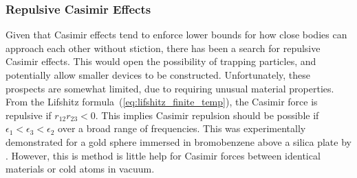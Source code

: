 




\subsubsection{Repulsive Casimir Effects}

Given that Casimir effects tend to enforce lower bounds for how close bodies can approach each other
without stiction, there has been a search for repulsive Casimir effects.  This would open the possibility
of trapping particles, and potentially allow smaller devices to be constructed.  
Unfortunately, these prospects are somewhat limited, due to requiring unusual material properties.
From the Lifshitz formula~(\ref{eq:lifshitz_finite_temp}), the Casimir force is repulsive if $r_{12}r_{23}<0$.
This implies Casimir repulsion should be possible if $\epsilon_1<\epsilon_3<\epsilon_2$ over a broad range of frequencies.
This was experimentally demonstrated for a gold sphere immersed in bromobenzene above a silica plate
by \citet{Munday2009}.  However, this is method is little help for Casimir forces between
identical materials or cold atoms in vacuum.  

